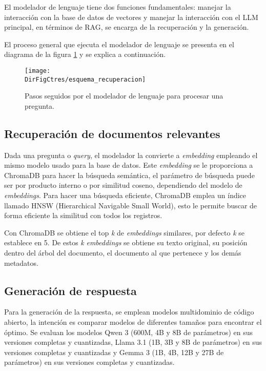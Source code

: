 El modelador de lenguaje tiene dos funciones fundamentales: manejar la
interacción con la base de datos de vectores y manejar la interacción con el
LLM principal, en términos de RAG, se encarga de la recuperación y la
generación.

El proceso general que ejecuta el modelador de lenguaje se presenta en el
diagrama de la figura \ref{fig:esquema_modelador} y se explica a continuación.

\begin{figure}[]
    \centering
    \texttt{[image: \\DirFigCtres/esquema\_recuperacion]}
    \caption{Pasos seguidos por el modelador de lenguaje para procesar una pregunta.}
    \label{fig:esquema_modelador}
\end{figure}

\subsection{Recuperación de documentos relevantes}

Dada una pregunta o \textit{query}, el modelador la convierte a \textit{embedding}
empleando el mismo modelo usado para la base de datos. Este \textit{embedding}
se le proporciona a ChromaDB para hacer la búsqueda semántica, el parámetro
de búsqueda puede ser por producto interno o por similitud coseno, dependiendo
del modelo de \textit{embeddings}. Para hacer una búsqueda eficiente,
ChromaDB emplea un índice llamado HNSW (Hierarchical Navigable Small World),
esto le permite buscar de forma eficiente la similitud con todos los registros.

Con ChromaDB se obtiene el top \textit{k} de \textit{embeddings} similares,
por defecto \textit{k} se establece en 5. De estos \textit{k} \textit{embeddings}
se obtiene su texto original, su posición dentro del árbol del documento, el
documento al que pertenece y los demás metadatos.

\subsection{Generación de respuesta}

Para la generación de la respuesta, se emplean modelos multidominio de código
abierto, la intención es comparar modelos de diferentes tamaños para
encontrar el óptimo. Se evaluan los modelos Qwen 3 \cite{zhang_qwen3_2025}
(600M, 4B y 8B de parámetros) en sus versiones completas y cuantizadas,
Llama 3.1 (1B, 3B y 8B de parámetros) en sus versiones completas y cuantizadas
y Gemma 3 (1B, 4B, 12B y 27B de parámetros) en sus versiones completas y
cuantizadas.

